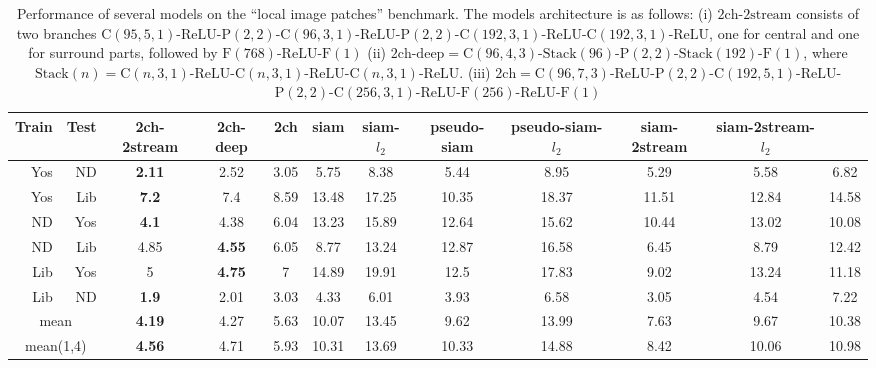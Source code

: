 \documentclass[10pt,twocolumn,letterpaper]{article}
\begin{document}
\begin{table*}[t]
\footnotesize
\begin{center}
\begin{tabular}{rrcccccccccc}
\hline
    Train  &  Test     & 2ch-2stream & 2ch-deep  & 2ch   & siam & siam-$l_2$ & pseudo-siam & pseudo-siam-$l_2$ & siam-2stream & siam-2stream-$l_2$ & \cite{Simonyan14} \\ \hline
Yos   & ND    & \textbf{2.11} & 2.52 & 3.05  & 5.75  & 8.38  & 5.44  & 8.95  & 5.29 & 5.58 & 6.82 \\
Yos   & Lib   & \textbf{7.2} & 7.4 & 8.59  & 13.48 & 17.25 & 10.35 & 18.37 & 11.51 & 12.84 &14.58 \\
ND    & Yos   & \textbf{4.1} & 4.38 & 6.04  & 13.23 & 15.89 & 12.64 & 15.62 & 10.44 & 13.02 & 10.08 \\
ND    & Lib   & 4.85 & \textbf{4.55} & 6.05  & 8.77  & 13.24 & 12.87 & 16.58 & 6.45 & 8.79 & 12.42 \\
Lib   & Yos   & 5 & \textbf{4.75} & 7     & 14.89 & 19.91 & 12.5  & 17.83 & 9.02  & 13.24 & 11.18 \\
Lib   & ND    & \textbf{1.9} & 2.01 & 3.03  & 4.33  & 6.01  & 3.93  & 6.58  & 3.05 & 4.54 & 7.22 \\
\hline
\multicolumn{2}{c}{mean} & \textbf{4.19} & 4.27 & 5.63  & 10.07 & 13.45 & 9.62  & 13.99 & 7.63 & 9.67 & 10.38 \\
\hline
\multicolumn{2}{c}{mean(1,4)} & \textbf{4.56} & 4.71 & 5.93  & 10.31 & 13.69 & 10.33 & 14.88 & 8.42 & 10.06 & 10.98 \\
\hline
\end{tabular}
\end{center}
\footnotesize
\caption{Performance of several models on the ``local image patches'' benchmark.
 The models architecture  is as follows:
 (i) $2\mathrm{ch}$-$2\mathrm{stream}$ consists of two branches $\mathrm{C}(95,5,1)$-$\mathrm{ReLU}$-$\mathrm{P}(2,2)$-$\mathrm{C}(96,3,1)$-$\mathrm{ReLU}$-$\mathrm{P}(2,2)$-$\mathrm{C}(192,3,1)$-$\mathrm{ReLU}$-$\mathrm{C}(192,3,1)$-$\mathrm{ReLU}$, one for central and one for surround parts, followed by $\mathrm{F}(768)$-$\mathrm{ReLU}$-$\mathrm{F}(1)$
(ii) $2\mathrm{ch}$-$\mathrm{deep}=\mathrm{C}(96,4,3)$-$\mathrm{Stack}(96)$-$\mathrm{P}(2,2)$-$\mathrm{Stack}(192)$-$\mathrm{F}(1)$, where $\mathrm{Stack}(n)=\mathrm{C}(n,3,1)$-$\mathrm{ReLU}$-$\mathrm{C}(n,3,1)$-$\mathrm{ReLU}$-$\mathrm{C}(n,3,1)$-$\mathrm{ReLU}$.
(iii) $2\mathrm{ch}=\mathrm{C}(96,7,3)$-$\mathrm{ReLU}$-$\mathrm{P}(2,2)$-$\mathrm{C}(192,5,1)$-$\mathrm{ReLU}$-$\mathrm{P}(2,2)$-$\mathrm{C}(256,3,1)$-$\mathrm{ReLU}$-$\mathrm{F}(256)$-$\mathrm{ReLU}$-$\mathrm{F}(1)$
}
\end{table*}
\end{document}
